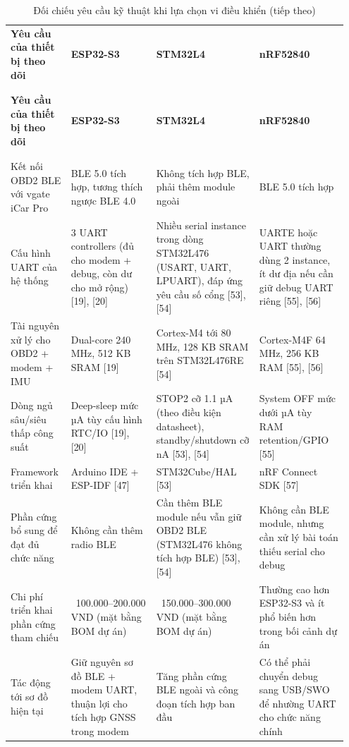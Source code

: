 \documentclass[a4paper]{extarticle}
\newcommand{\thesissettableid}[2]{%
  \renewcommand{\thetable}{#1}%
  \renewcommand{\theHtable}{#2}%
}
\begin{document}
{\thesissettableid{3.1}{tab-ch3-oi-chieu-yeu-cau-ky-thuat-khi-lua-chon-vi-ieu-khien}
\def\LTcaptype{table}
\begin{longtable}{|L{0.153\linewidth}|L{0.247\linewidth}|L{0.299\linewidth}|L{0.255\linewidth}|}
\caption{Đối chiếu yêu cầu kỹ thuật khi lựa chọn vi điều khiển}\label{tab:ch3-oi-chieu-yeu-cau-ky-thuat-khi-lua-chon-vi-ieu-khien}\\
\hline \textbf{Yêu cầu của thiết bị theo dõi} & \textbf{ESP32-S3} & \textbf{STM32L4} & \textbf{nRF52840} \\
\\\hline
\endfirsthead
\caption[]{Đối chiếu yêu cầu kỹ thuật khi lựa chọn vi điều khiển (tiếp theo)}\\
\hline \textbf{Yêu cầu của thiết bị theo dõi} & \textbf{ESP32-S3} & \textbf{STM32L4} & \textbf{nRF52840} \\
\\\hline
\endhead
\\\hline
\endfoot
\endlastfoot
Kết nối OBD2 BLE với vgate iCar Pro & BLE 5.0 tích hợp, tương thích
ngược BLE 4.0 & Không tích hợp BLE, phải thêm module ngoài & BLE 5.0
tích hợp \\\hline
Cấu hình UART của hệ thống & 3 UART controllers (đủ cho modem + debug,
còn dư cho mở rộng) {[}19{]}, {[}20{]} & Nhiều serial instance trong
dòng STM32L476 (USART, UART, LPUART), đáp ứng yêu cầu số cổng {[}53{]},
{[}54{]} & UARTE hoặc UART thường dùng 2 instance, ít dư địa nếu cần giữ
debug UART riêng {[}55{]}, {[}56{]} \\\hline
Tài nguyên xử lý cho OBD2 + modem + IMU & Dual-core 240 MHz, 512 KB SRAM
{[}19{]} & Cortex-M4 tới 80 MHz, 128 KB SRAM trên STM32L476RE {[}54{]} &
Cortex-M4F 64 MHz, 256 KB RAM {[}55{]}, {[}56{]} \\\hline
Dòng ngủ sâu/siêu thấp công suất & Deep-sleep mức µA tùy cấu hình RTC/IO
{[}19{]}, {[}20{]} & STOP2 cỡ 1.1 µA (theo điều kiện datasheet),
standby/shutdown cỡ nA {[}53{]}, {[}54{]} & System OFF mức dưới µA tùy
RAM retention/GPIO {[}55{]} \\\hline
Framework triển khai & Arduino IDE + ESP-IDF {[}47{]} & STM32Cube/HAL
{[}53{]} & nRF Connect SDK {[}57{]} \\\hline
Phần cứng bổ sung để đạt đủ chức năng & Không cần thêm radio BLE & Cần
thêm BLE module nếu vẫn giữ OBD2 BLE (STM32L476 không tích hợp BLE)
{[}53{]}, {[}54{]} & Không cần BLE module, nhưng cần xử lý bài toán
thiếu serial cho debug \\\hline
Chi phí triển khai phần cứng tham chiếu &
~100.000--200.000 VND (mặt bằng BOM dự án) &
~150.000--300.000 VND (mặt bằng BOM dự án) & Thường cao
hơn ESP32-S3 và ít phổ biến hơn trong bối cảnh dự án \\\hline
Tác động tới sơ đồ hiện tại & Giữ nguyên sơ đồ BLE + modem UART, thuận
lợi cho tích hợp GNSS trong modem & Tăng phần cứng BLE ngoài và công
đoạn tích hợp ban đầu & Có thể phải chuyển debug sang USB/SWO để nhường
UART cho chức năng chính \\\hline
\end{longtable}
}
\end{document}
